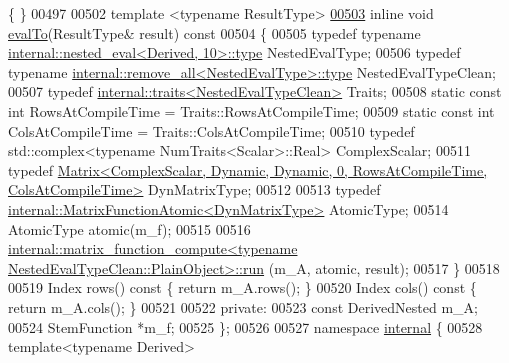 \begin{DoxyCode}
      \{ \}
00497 
00502     \textcolor{keyword}{template} <\textcolor{keyword}{typename} ResultType>
\hyperlink{class_eigen_1_1_matrix_function_return_value_a202d594ae254e3ea5420ff95d9f03a67}{00503}     \textcolor{keyword}{inline} \textcolor{keywordtype}{void} \hyperlink{class_eigen_1_1_matrix_function_return_value_a202d594ae254e3ea5420ff95d9f03a67}{evalTo}(ResultType& result)\textcolor{keyword}{ const}
00504 \textcolor{keyword}{    }\{
00505       \textcolor{keyword}{typedef} \textcolor{keyword}{typename} \hyperlink{class_eigen_1_1internal_1_1_tensor_lazy_evaluator_writable}{internal::nested\_eval<Derived, 10>::type} 
      NestedEvalType;
00506       \textcolor{keyword}{typedef} \textcolor{keyword}{typename} \hyperlink{group___sparse_core___module}{internal::remove\_all<NestedEvalType>::type}
       NestedEvalTypeClean;
00507       \textcolor{keyword}{typedef} \hyperlink{struct_eigen_1_1internal_1_1traits}{internal::traits<NestedEvalTypeClean>} Traits;
00508       \textcolor{keyword}{static} \textcolor{keyword}{const} \textcolor{keywordtype}{int} RowsAtCompileTime = Traits::RowsAtCompileTime;
00509       \textcolor{keyword}{static} \textcolor{keyword}{const} \textcolor{keywordtype}{int} ColsAtCompileTime = Traits::ColsAtCompileTime;
00510       \textcolor{keyword}{typedef} std::complex<typename NumTraits<Scalar>::Real> ComplexScalar;
00511       \textcolor{keyword}{typedef} 
      \hyperlink{group___core___module_class_eigen_1_1_matrix}{Matrix<ComplexScalar, Dynamic, Dynamic, 0, RowsAtCompileTime, ColsAtCompileTime>}
       DynMatrixType;
00512 
00513       \textcolor{keyword}{typedef} \hyperlink{class_eigen_1_1internal_1_1_matrix_function_atomic}{internal::MatrixFunctionAtomic<DynMatrixType>} 
      AtomicType;
00514       AtomicType atomic(m\_f);
00515 
00516       
      \hyperlink{struct_eigen_1_1internal_1_1matrix__function__compute_a55a328773f5254d0cd29ac699bc2634f}{internal::matrix\_function\_compute<typename NestedEvalTypeClean::PlainObject>::run}
      (m\_A, atomic, result);
00517     \}
00518 
00519     Index rows()\textcolor{keyword}{ const }\{ \textcolor{keywordflow}{return} m\_A.rows(); \}
00520     Index cols()\textcolor{keyword}{ const }\{ \textcolor{keywordflow}{return} m\_A.cols(); \}
00521 
00522   \textcolor{keyword}{private}:
00523     \textcolor{keyword}{const} DerivedNested m\_A;
00524     StemFunction *m\_f;
00525 \};
00526 
00527 \textcolor{keyword}{namespace }\hyperlink{namespaceinternal}{internal} \{
00528 \textcolor{keyword}{template}<\textcolor{keyword}{typename} Derived>

\end{DoxyCode}
